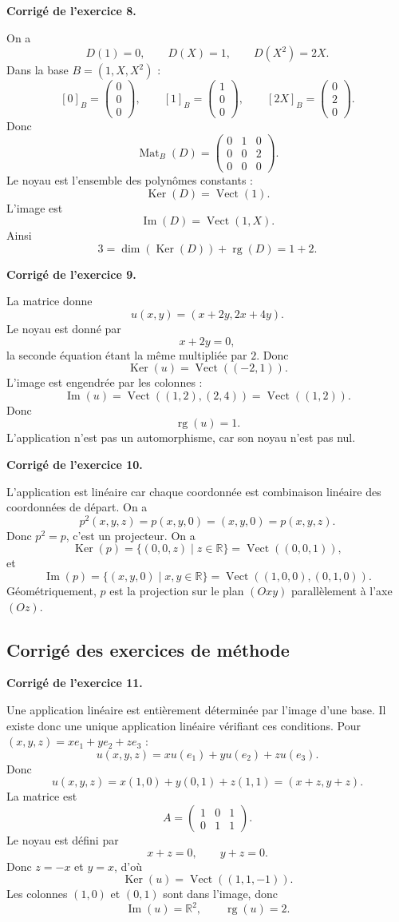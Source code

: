 \documentclass[11pt,a4paper]{article}
\newcommand{\corr}[1]{
    \vspace{0.4cm}
    \noindent\textbf{\textcolor{bleuprepa}{Corrigé de l'exercice #1.}}
    \par\vspace{0.1cm}
}
\newcommand{\R}{\mathbb{R}}
\newcommand{\Ker}{\operatorname{Ker}}
\newcommand{\Img}{\operatorname{Im}}
\newcommand{\rg}{\operatorname{rg}}
\newcommand{\Mat}{\operatorname{Mat}}
\newcommand{\Vect}{\operatorname{Vect}}
\begin{document}
\corr{8}
On a
\[
D(1)=0,\qquad D(X)=1,\qquad D(X^2)=2X.
\]
Dans la base $B=(1,X,X^2)$ :
\[
[0]_B=\begin{pmatrix}0\\0\\0\end{pmatrix},\qquad
[1]_B=\begin{pmatrix}1\\0\\0\end{pmatrix},\qquad
[2X]_B=\begin{pmatrix}0\\2\\0\end{pmatrix}.
\]
Donc
\[
\Mat_B(D)=
\begin{pmatrix}
0&1&0\\
0&0&2\\
0&0&0
\end{pmatrix}.
\]
Le noyau est l'ensemble des polynômes constants :
\[
\Ker(D)=\Vect(1).
\]
L'image est
\[
\Img(D)=\Vect(1,X).
\]
Ainsi
\[
3=\dim(\Ker(D))+\rg(D)=1+2.
\]

\corr{9}
La matrice donne
\[
u(x,y)=(x+2y,2x+4y).
\]
Le noyau est donné par
\[
x+2y=0,
\]
la seconde équation étant la même multipliée par $2$. Donc
\[
\Ker(u)=\Vect((-2,1)).
\]
L'image est engendrée par les colonnes :
\[
\Img(u)=\Vect((1,2),(2,4))=\Vect((1,2)).
\]
Donc
\[
\rg(u)=1.
\]
L'application n'est pas un automorphisme, car son noyau n'est pas nul.

\corr{10}
L'application est linéaire car chaque coordonnée est combinaison linéaire des coordonnées de départ. On a
\[
p^2(x,y,z)=p(x,y,0)=(x,y,0)=p(x,y,z).
\]
Donc $p^2=p$, c'est un projecteur. On a
\[
\Ker(p)=\{(0,0,z)\mid z\in\R\}=\Vect((0,0,1)),
\]
et
\[
\Img(p)=\{(x,y,0)\mid x,y\in\R\}=\Vect((1,0,0),(0,1,0)).
\]
Géométriquement, $p$ est la projection sur le plan $(Oxy)$ parallèlement à l'axe $(Oz)$.

\subsection{Corrigé des exercices de méthode}

\corr{11}
Une application linéaire est entièrement déterminée par l'image d'une base. Il existe donc une unique application linéaire vérifiant ces conditions. Pour $(x,y,z)=xe_1+ye_2+ze_3$ :
\[
u(x,y,z)=xu(e_1)+yu(e_2)+zu(e_3).
\]
Donc
\[
u(x,y,z)=x(1,0)+y(0,1)+z(1,1)=(x+z,y+z).
\]
La matrice est
\[
A=
\begin{pmatrix}
1&0&1\\
0&1&1
\end{pmatrix}.
\]
Le noyau est défini par
\[
x+z=0,\qquad y+z=0.
\]
Donc $z=-x$ et $y=x$, d'où
\[
\Ker(u)=\Vect((1,1,-1)).
\]
Les colonnes $(1,0)$ et $(0,1)$ sont dans l'image, donc
\[
\Img(u)=\R^2,\qquad \rg(u)=2.
\]
\end{document}
